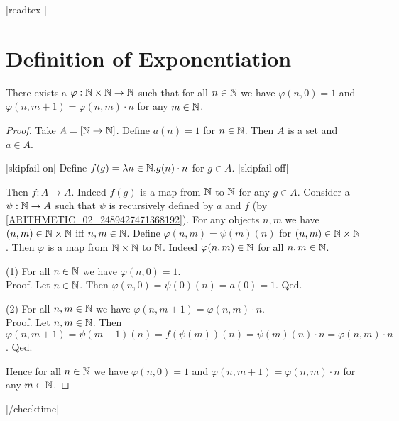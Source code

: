 \documentclass[10pt]{article}
\begin{document}
  \begin{imports}
    \begin{forthel}
      [readtex ]
    \end{forthel}
  \end{imports}


  \section{Definition of Exponentiation}

  \begin{forthel}
    [checktime 3]
    \begin{lemma}
      There exists a $\varphi : \mathbb{N} \times \mathbb{N} \to \mathbb{N}$ such
      that for all $n \in \mathbb{N}$ we have $\varphi(n, 0) = 1$ and
      $\varphi(n, m + 1) = \varphi(n,m) \cdot n$ for any $m \in \mathbb{N}$.
    \end{lemma}
    \begin{proof}
      Take $A = [\mathbb{N} \to \mathbb{N}]$.
      Define $a(n) = 1$ for $n \in \mathbb{N}$.
      Then $A$ is a set and $a \in A$.

      [skipfail on] %
      Define $f(g) = \mathrm{\lambda} n \in \mathbb{N}. g(n) \cdot n$ for $g \in A$.
      [skipfail off]

      Then $f : A \to A$.
      Indeed $f(g)$ is a map from $\mathbb{N}$ to $\mathbb{N}$ for any $g \in A$.
      Consider a $\psi : \mathbb{N} \to A$ such that $\psi$ is recursively defined by
      $a$ and $f$ (by \cref{ARITHMETIC_02_2489427471368192}).
      For any objects $n, m$ we have $(n,m) \in \mathbb{N} \times \mathbb{N}$ iff
      $n, m \in \mathbb{N}$.
      Define $\varphi(n,m) = \psi(m)(n)$ for $(n,m) \in \mathbb{N} \times \mathbb{N}$.
      Then $\varphi$ is a map from $\mathbb{N} \times \mathbb{N}$ to $\mathbb{N}$.
      Indeed $\varphi(n,m) \in \mathbb{N}$ for all $n, m \in \mathbb{N}$.

      (1) For all $n \in \mathbb{N}$ we have $\varphi(n,0) = 1$. \\
      Proof.
        Let $n \in \mathbb{N}$.
        Then $\varphi(n,0)
          = \psi(0)(n)
          = a(0)
          = 1$.
      Qed.

      (2) For all $n, m \in \mathbb{N}$ we have $\varphi(n, m + 1) =
      \varphi(n,m) \cdot n$. \\
      Proof.
        Let $n, m \in \mathbb{N}$.
        Then $\varphi(n, m + 1)
          = \psi(m + 1)(n)
          = f(\psi(m))(n)
          = \psi(m)(n) \cdot n
          = \varphi(n,m) \cdot n$.
      Qed.

      Hence for all $n \in \mathbb{N}$ we have $\varphi(n, 0) = 1$ and
      $\varphi(n, m + 1) = \varphi(n,m) \cdot n$ for any $m \in \mathbb{N}$.
    \end{proof}
    [/checktime]
  \end{forthel}
\end{document}
